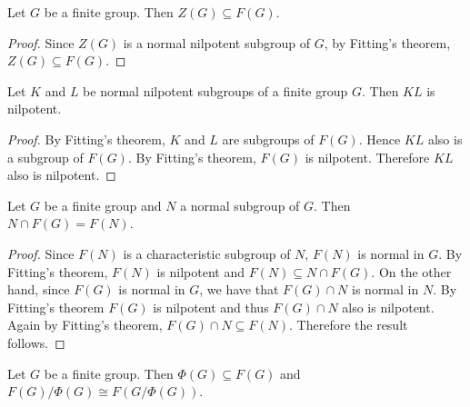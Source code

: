 \begin{corollary}
	\label{corollary:Z(G)subsetF(G)}
	Let $G$ be a finite group. Then $Z(G)\subseteq F(G)$.
\end{corollary}

\begin{proof}
	Since $Z(G)$ is a normal nilpotent subgroup of $G$, by Fitting's theorem,
	$Z(G)\subseteq F(G)$. 
\end{proof}

\begin{corollary}[Fitting]
	\label{corollary:Fitting}
	Let $K$ and $L$ be normal nilpotent subgroups of a finite group $G$.
	Then $KL$ is nilpotent.
\end{corollary}

\begin{proof}
	By Fitting's theorem, $K$ and $L$ are subgroups of $F(G)$. Hence $KL$ also is a subgroup of $F(G)$. By Fitting's theorem, 
	$F(G)$ is nilpotent. Therefore  $KL$ also is nilpotent.
\end{proof}

\begin{corollary}
	\label{corollary:McapF(G)}
	Let $G$ be a finite group and $N$ a normal subgroup of $G$. Then
	$N\cap F(G)=F(N)$.
\end{corollary}

\begin{proof}
	Since $F(N)$ is a characteristic subgroup of $N$, $F(N)$ is normal in $G$. By Fitting's theorem, $F(N)$ is nilpotent and
	$F(N)\subseteq N\cap F(G)$. 
	On the other hand, since 
	$F(G)$ is normal in $G$, we have that $F(G)\cap N$ is normal in $N$. By Fitting's theorem $F(G)$ is nilpotent and thus $F(G)\cap N$
	also is nilpotent. Again by Fitting's theorem, $F(G)\cap N\subseteq F(N)$. Therefore the result follows. 
\end{proof}


\begin{theorem}
	Let $G$ be a finite group. Then
    $\Phi(G)\subseteq F(G)$ and $F(G)/\Phi(G)\cong F(G/\Phi(G))$.
\end{theorem}

